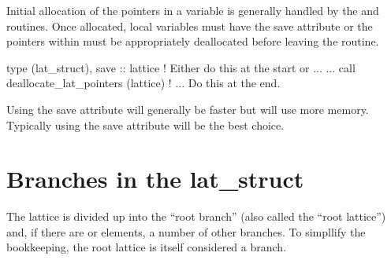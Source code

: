Initial allocation of the pointers in a  variable is
generally handled by the  
and 
routines.  Once allocated, local  variables must have
the save attribute or the pointers within must be appropriately
deallocated before leaving the routine.
\begin{example}
  type (lat_struct), save :: lattice     ! Either do this at the start or ...
  ...
  call deallocate_lat_pointers (lattice) ! ... Do this at the end.
\end{example}
Using the save attribute will generally be faster but will use more
memory. Typically using the save attribute will be the best choice.

\section{Branches in the lat_struct}
\label {s:lat.struct}

The lattice is divided up into the ``root branch'' 
(also called the ``root lattice'') and, if there are
 or  elements, a number of other branches. 
To simpllify the bookkeeping, the root lattice is itself considered a branch.

